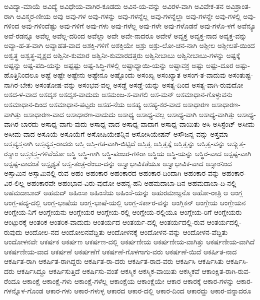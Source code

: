 {ಅವಿದ್ಯಾ-ಮಾಯೆ
ಅವಿದ್ಯೆ
ಅವಿಧೇಯ-ವಾಗಿರ-ಕೂಡದು
ಅವಿನ-ಯ-ವನ್ನು
ಅವಿರಳ-ವಾಗಿ
ಅವಿವೇಕ-ತನ
ಅವಿಶ್ರಾಂತ-ರಾಗಿ
ಅವಿಸ್ಮರ-ಣೀಯ
ಅವು
ಅವು-ಗಳ
ಅವು-ಗಳನ್ನು
ಅವು-ಗಳನ್ನೆಲ್ಲ
ಅವು-ಗಳನ್ನೆಲ್ಲಾ
ಅವು-ಗಳನ್ನೇ
ಅವು-ಗಳಲ್ಲಿ
ಅವು-ಗಳಿಂದ
ಅವು-ಗಳಿಂದೆಷ್ಟು
ಅವು-ಗಳಿಗೆ
ಅವು-ಗಳು
ಅವು-ಗಳೆಲ್ಲ
ಅವು-ಗಳೇ
ಅವು-ಗಳೊಡನೆ
ಅವು-ಗಳೊ-ಳಗೆ
ಅವೆನ್ಯೂ
ಅವೆ-ರಡನ್ನೂ
ಅವೆಲ್ಲ
ಅವೆಲ್ಲ-ದರಿಂದ
ಅವೆಲ್ಲಾ
ಅವೇ
ಅವೇ-ನಾದರೂ
ಅವೇಳೆ
ಅವ್ಯಕ್ತ
ಅವ್ಯಕ್ತ-ನಾದ
ಅವ್ಯಕ್ತ-ವನ್ನು
ಅವ್ಯಾ-ಹ-ತ-ವಾಗಿ
ಅವ್ಯಾಹತ-ವಾದ
ಅಶಕ್ತಿ-ಗಳಿಗೆ
ಅಶಕ್ತಿಯೇ
ಅಶ್ರು
ಅಶ್ರು-ಲೋ-ಚನ-ನಾಗಿ
ಅಶ್ಲೀಲ
ಅಶ್ಲೀಲತೆ-ಯಿಂದ
ಅಶ್ವತ್ಥ
ಅಶ್ವತ್ಥ-ವೃಕ್ಷದ
ಅಶ್ವಿನೀ-ಕುಮಾರ
ಅಶ್ವಿನೀ-ಕುಮಾರದತ್ತರು
ಅಶ್ವಿನೀಬಾಬು
ಅಶ್ವಿನೀಬಾಬು-ಗಳನ್ನು
ಅಷ್ಟಕ್ಕೆ
ಅಷ್ಟನ್ನು
ಅಷ್ಟ-ಪದಿ-ಯನ್ನು
ಅಷ್ಟಷ್ಟು
ಅಷ್ಟ-ಸಿದ್ಧಿ-ಗಳಲ್ಲಿ
ಅಷ್ಟಾಧ್ಯಾಯಿ-ಯನ್ನು
ಅಷ್ಟಾವಕ್ರ
ಅಷ್ಟು
ಅಷ್ಟು-ದೂರ
ಅಷ್ಟು-ಹೊತ್ತಿನಿಂದಲೂ
ಅಷ್ಟೆ
ಅಷ್ಟೇ
ಅಷ್ಟೇನು
ಅಷ್ಟೇನೂ
ಅಷ್ಟೊಂದು
ಅಸಂಖ್ಯ
ಅಸಂಖ್ಯಾತ
ಅಸಂಗ-ತ-ವಾದುವು
ಅಸಂತುಷ್ಟ-ನಾಗಿರ-ಬೇಕು
ಅಸಂತೋಷ-ವನ್ನು
ಅಸಂಭವ-ವಲ್ಲ
ಅಸಡ್ಡೆ
ಅಸಡ್ಡೆ-ಯನ್ನು
ಅಸತ್ಯ-ದಿಂದ
ಅಸತ್ಯ-ವಾಗಿ-ರುವುದೋ
ಅಸದ-ಳ-ವಾದ
ಅಸದೃಶ
ಅಸದೃಶ-ವಾದುದು
ಅಸಮಂಜ-ಸ-ವಾಗಲಿ
ಅಸ-ಮನ್
ಅಸಮಾಧಾನ-ಗೊಳ್ಳುವನು
ಅಸಮಾಧಾನ-ದಿಂದ
ಅಸಮಾಧಾನ-ಪಟ್ಟರು
ಅಸಹ-ನೆಯ
ಅಸಹ್ಯ
ಅಸಹ್ಯ-ಕರ-ವಾದ
ಅಸಾಧಾರಣ
ಅಸಾಧಾರಣ-ವಾಗಿತ್ತು
ಅಸಾಧಾರಣ-ವಾದ
ಅಸಾಧಾರಣ-ವಾದುದು
ಅಸಾಧ್ಯ
ಅಸಾಧ್ಯ-ವಲ್ಲ
ಅಸಾಧ್ಯ-ವಾಗಿ
ಅಸಾಧ್ಯ-ವಾಗಿತ್ತು
ಅಸಾಧ್ಯ-ವಾಗಿರ-ಬಾರದು
ಅಸಾಧ್ಯ-ವಾಗು-ವುದು
ಅಸಾಧ್ಯ-ವಾದ
ಅಸಾಧ್ಯ-ವಾದಾಗ
ಅಸಾಧ್ಯ-ವಾಯಿತು
ಅಸಿ
ಅಸಿಸ್ಟೆಂಟ್
ಅಸೀಮ
ಅಸೀಮ-ವಾದ
ಅಸೂಯೆ
ಅಸೂಯೆಗೆ
ಅಸೋಷಿಯೇಶನ್ನಿನ
ಅಸೋಸಿಯೇಷನ್
ಅಸೌಜನ್ಯ-ವನ್ನು
ಅಸ್ತಮಾ
ಅಸ್ತವ್ಯಸ್ತನಾಗಿ
ಅಸ್ತವ್ಯಸ್ತ-ರಾದರು
ಅಸ್ತಿ
ಅಸ್ತಿ-ಗತ-ವಾಗಿ-ಬಿಟ್ಟಿದೆ
ಅಸ್ತಿತ್ವ
ಅಸ್ತಿತ್ವಕ್ಕೆ
ಅಸ್ತಿತ್ವನ್ನು
ಅಸ್ತಿತ್ವ-ವನ್ನು
ಅಸ್ತ್ಯುತ್ತ-ರಸ್ಯಾಂ
ಅಸ್ತ್ರಶಸ್ತ್ರ-ಗಳಿವೆಯೋ
ಅಸ್ಥಿ
ಅಸ್ಥಿ-ಗಾಗಿ
ಅಸ್ಥಿ-ಪಂಜರ-ಗಳಿರಾ
ಅಸ್ಥಿಯ
ಅಸ್ಥಿ-ಯನ್ನು
ಅಸ್ಥಿರ-ವಾದ
ಅಸ್ಪಷ್ಟ-ವಾಗಿ
ಅಸ್ಪಷ್ಟ-ವಾದಂತೆ
ಅಸ್ಪೃಶ್ಯತೆ
ಅಸ್ವ-ತಂತ್ರ-ರೆಂಬು-ದನ್ನು
ಅಸ್ವಾಭಾವಿಕತೆಯೂ
ಅಸ್ವಾಭಾವಿಕ-ವಾದ
ಅಸ್ಸಾಂನಿಂದ
ಅಸ್ಸಾಮಿನ
ಅಸ್ಸಾಮಿನಲ್ಲಿ-ರುವ
ಅಹಂ
ಅಹಂಕಾರ
ಅಹಂಕಾರದ
ಅಹಂಕಾರ-ದಿಂದಾಗಿ
ಅಹಂಕಾರ-ವನ್ನು
ಅಹಂಕಾರ-ವಿರ-ಲಿಲ್ಲ
ಅಹಂಕಾರವೇ
ಅಹಂಭಾವ-ವಿರು-ವುದೋ
ಅಹನ್ಯ-ಹನಿ
ಅಹಮದಾಬಾ-ದಿನ
ಅಹಮದಾಬಾ-ದಿ-ನಲ್ಲಿ
ಅಹಮದಾಬಾದ್
ಅಹಮದ್
ಅಹಿಂಸಾ
ಅಹಿಂಸೆಯ
ಅಹಿಂಸೆ-ಯನ್ನು
ಅಹುರಮಾಜ್ದನೊ
ಅಹೋ-ರಾತ್ರಿ
ಆ
ಆಂಗ್ಲ
ಆಂಗ್ಲ-ಪದ್ಯ-ದಲ್ಲಿ
ಆಂಗ್ಲ-ಭಾಷೆಯ
ಆಂಗ್ಲ-ಭಾಷೆ-ಯಲ್ಲಿ
ಆಂಗ್ಲ-ಸರ್ಕಾರ-ವನ್ನು
ಆಂಗ್ಲಿಕನ್
ಆಂಗ್ಲೇಯ
ಆಂಗ್ಲೇಯನ
ಆಂಗ್ಲೇಯ-ನಿಗೆ
ಆಂಗ್ಲೇಯನು
ಆಂಗ್ಲೇಯರ
ಆಂಗ್ಲೇಯ-ರಲ್ಲಿ
ಆಂಗ್ಲೇಯ-ರಲ್ಲಿಯೂ
ಆಂಗ್ಲೇಯ-ರಿಗೆ
ಆಂಗ್ಲೇಯರು
ಆಂಟ್ಪುರಕ್ಕೆ
ಆಂತರಿಕ
ಆಂತರಿಕ-ವಾದುದು
ಆಂತರ್ಯದ
ಆಂತರ್ಯ-ದಲ್ಲಿ
ಆಂತರ್ಯದಲ್ಲಿ-ರುವ
ಆಂತರ್ಯದಲ್ಲಿ-ರುವುದು
ಆಂದೋಲ-ನದ
ಆಂದೋಲನವೆದ್ದಿತು
ಆಂದೋಳನಕ್ಕೆ
ಆಂದೋಳನ-ವನ್ನು
ಆಂದೋಳನ-ವೆದ್ದಿತು
ಆಂದೋಳನವೇ
ಆಕರ್ಷಕ
ಆಕರ್ಷಣ
ಆಕರ್ಷಣ-ದಲ್ಲಿ
ಆಕರ್ಷಣೀಯ
ಆಕರ್ಷಣೀಯ-ವಾಗಿತ್ತು
ಆಕರ್ಷಣೀಯ-ವಾಗಿದೆ
ಆಕರ್ಷಣೀಯ-ವಾದ
ಆಕರ್ಷಣೆ
ಆಕರ್ಷಣೆಗೆ
ಆಕರ್ಷಣೆ-ಗೊಳಗಾಗು-ವರು
ಆಕರ್ಷಣೆ-ಯಿದೆ
ಆಕರ್ಷಿತ-ನಾದ
ಆಕರ್ಷಿತ-ರಾಗಿ
ಆಕರ್ಷಿತ-ರಾಗಿದ್ದರು
ಆಕರ್ಷಿತ-ರಾ-ದರು
ಆಕರ್ಷಿತ-ರಾದ-ವರು
ಆಕರ್ಷಿಸಿ
ಆಕರ್ಷಿಸಿತು
ಆಕರ್ಷಿಸಿ-ದರು
ಆಕರ್ಷಿಸಿದ್ದೂ
ಆಕರ್ಷಿಸುತ್ತಿದೆ
ಆಕರ್ಷಿಸು-ವಂತೆ
ಆಕಸ್ಮಿಕ
ಆಕಸ್ಮಿಕ-ವಾಯಿತು
ಆಕಸ್ಮಿಕವೆ
ಆಕಾಂಕ್ಷಿತ-ರಾಗಿ-ರುವ-ರೆಂದೂ
ಆಕಾಂಕ್ಷೆ
ಆಕಾಂಕ್ಷೆ-ಗಳು
ಆಕಾಂಕ್ಷೆ-ಗಳೆಲ್ಲ
ಆಕಾಂಕ್ಷೆಯ
ಆಕಾಂಕ್ಷೆಯೇ
ಆಕಾರ
ಆಕಾರಕ್ಕೆ
ಆಕಾರ-ಗಳನ್ನು
ಆಕಾರ-ಗಳನ್ನೊಳ-ಗೊಂಡ
ಆಕಾರ-ಗಳು
ಆಕಾರ-ಗಳುಳ್ಳ
ಆಕಾರದ
ಆಕಾರ-ದಲ್ಲಿ
ಆಕಾರ-ದಿಂದ
ಆಕಾರದ್ದು
ಆಕಾರ-ವನ್ನಾದರೂ
}
